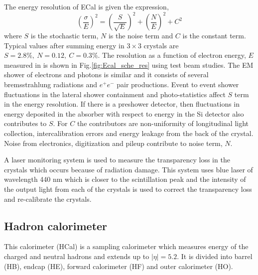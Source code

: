 \noindent The energy resolution of ECal is given the expression,
\begin{equation}
\label{eqn:ecalReso}
{\left(\frac{\sigma}{E}\right)}^2  =  {\left(\frac{S}{\sqrt{E}}\right)}^2 + {\left(\frac{N}{E}\right)}^2 + C^2
\end{equation}
where $S$ is the stochastic term, $N$ is the noise term and $C$ is the constant term. Typical values after summing energy in $3\times3$ 
crystals are $S=2.8\%,\ N=0.12,\ C=0.3\%$. The resolution as a function of electron energy, $E$ measured in \gev is shown in 
Fig.\ref{fig:Ecal_sche_res} using test beam studies. The EM shower of electrons and photons is similar and it consists of several 
bremsstrahlung radiations and $e^+e^-$ pair productions. Event to event shower fluctuations in the lateral shower containment and
photo-statistics affect $S$ term in the energy resolution. If there is a preshower detector, then fluctuations in energy deposited in the 
absorber with respect to energy in the Si detector also contributes to $S$. For $C$ the contributors are non-uniformity of longitudinal 
light collection, intercalibration errors and energy leakage from the back of the crystal. Noise from electronics, digitization and pileup 
contribute to noise term, $N$.

A laser monitoring system is used to measure the transparency loss in the crystals which occurs because of radiation damage. This system 
uses blue laser of wavelength 440 nm which is closer to the scintillation peak and the intensity of the output light from each of the 
crystals is used to correct the transparency loss and re-calibrate the crystals.

\subsection{Hadron calorimeter}
This calorimeter (HCal) is a sampling calorimeter which measures energy of the charged and neutral hadrons and extends up to $|\eta| = 
5.2$. It is divided into barrel (HB), endcap (HE), forward calorimeter (HF) and outer calorimeter (HO). 

